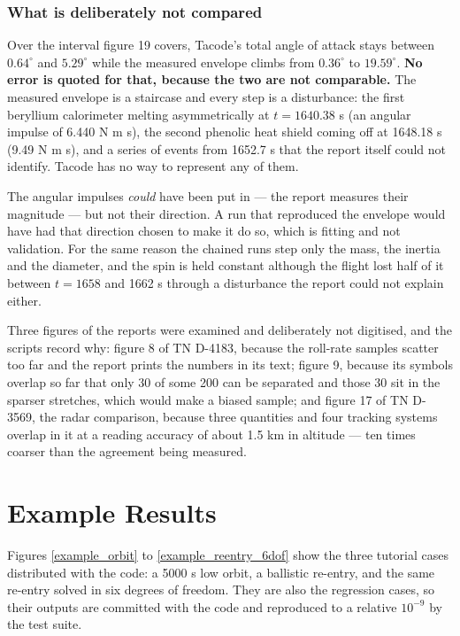 \documentclass[11pt,a4paper]{article}
\begin{document}
\subsubsection{What is deliberately not compared}

Over the interval figure 19 covers, Tacode's total angle of attack stays between
$0.64^\circ$ and $5.29^\circ$ while the measured envelope climbs from $0.36^\circ$ to
$19.59^\circ$. \textbf{No error is quoted for that, because the two are not comparable.}
The measured envelope is a staircase and every step is a disturbance: the first beryllium
calorimeter melting asymmetrically at $t = 1640.38$ s (an angular impulse of
6.440 N m s), the second phenolic heat shield coming off at 1648.18 s (9.49 N m s), and a
series of events from 1652.7 s that the report itself could not identify. Tacode has no
way to represent any of them.

The angular impulses \emph{could} have been put in --- the report measures their magnitude
--- but not their direction. A run that reproduced the envelope would have had that
direction chosen to make it do so, which is fitting and not validation. For the same
reason the chained runs step only the mass, the inertia and the diameter, and the spin is
held constant although the flight lost half of it between $t = 1658$ and 1662 s through a
disturbance the report could not explain either.

Three figures of the reports were examined and deliberately not digitised, and the scripts
record why: figure 8 of TN D-4183, because the roll-rate samples scatter too far and the
report prints the numbers in its text; figure 9, because its symbols overlap so far that
only 30 of some 200 can be separated and those 30 sit in the sparser stretches, which
would make a biased sample; and figure 17 of TN D-3569, the radar comparison, because
three quantities and four tracking systems overlap in it at a reading accuracy of about
1.5 km in altitude --- ten times coarser than the agreement being measured.

\section{Example Results}

Figures \ref{example_orbit} to \ref{example_reentry_6dof} show the three tutorial cases
distributed with the code: a 5000 s low orbit, a ballistic re-entry, and the same re-entry
solved in six degrees of freedom. They are also the regression cases, so their outputs are
committed with the code and reproduced to a relative $10^{-9}$ by the test suite.
\end{document}
